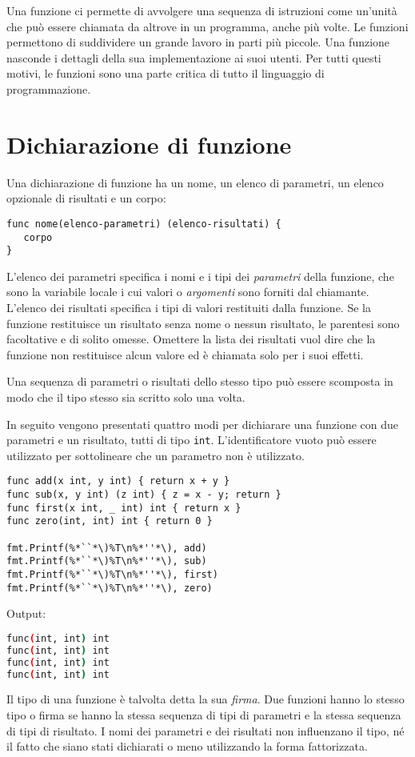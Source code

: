 Una funzione ci permette di avvolgere una sequenza di istruzioni come un'unità che può essere chiamata da altrove in un programma, anche più volte.
Le funzioni permettono di suddividere un grande lavoro in parti più piccole.
Una funzione nasconde i dettagli della sua implementazione ai suoi utenti.
Per tutti questi motivi, le funzioni sono una parte critica di tutto il linguaggio di programmazione.


\section{Dichiarazione di funzione}
\label{sec:dichiarazione_di_funzione}%
Una dichiarazione di funzione ha un nome, un elenco di parametri, un elenco opzionale di risultati e un corpo:
\begin{lstlisting}[label={lst:lstlisting4-1.1}]
func nome(elenco-parametri) (elenco-risultati) {
   corpo
}
\end{lstlisting}
L'elenco dei parametri specifica i nomi e i tipi dei \textit{parametri} della funzione, che sono la variabile locale i cui valori o \textit{argomenti} sono forniti dal chiamante.
L'elenco dei risultati specifica i tipi di valori restituiti dalla funzione.
Se la funzione restituisce un risultato senza nome o nessun risultato, le parentesi sono facoltative e di solito omesse.
Omettere la lista dei risultati vuol dire che la funzione non restituisce alcun valore ed è chiamata solo per i suoi effetti.

Una sequenza di parametri o risultati dello stesso tipo può essere scomposta in modo che il tipo stesso sia scritto solo una volta.

In seguito vengono presentati quattro modi per dichiarare una funzione con due parametri e un risultato, tutti di tipo \verb|int|.
L'identificatore vuoto può essere utilizzato per sottolineare che un parametro non è utilizzato.
\begin{lstlisting}[frame=single, label={lst:lstlisting4-1.2}]
func add(x int, y int) { return x + y }
func sub(x, y int) (z int) { z = x - y; return }
func first(x int, _ int) int { return x }
func zero(int, int) int { return 0 }

fmt.Printf(%*``*\)%T\n%*''*\), add)
fmt.Printf(%*``*\)%T\n%*''*\), sub)
fmt.Printf(%*``*\)%T\n%*''*\), first)
fmt.Printf(%*``*\)%T\n%*''*\), zero)
\end{lstlisting}
Output:
\begin{lstlisting}[language=bash, frame=L, label={lst:lstlisting4-1.3}]
func(int, int) int
func(int, int) int
func(int, int) int
func(int, int) int
\end{lstlisting}
Il tipo di una funzione è talvolta detta la sua \textit{firma}.
Due funzioni hanno lo stesso tipo o firma se hanno la stessa sequenza di tipi di parametri e la stessa sequenza di tipi di risultato.
I nomi dei parametri e dei risultati non influenzano il tipo, né il fatto che siano stati dichiarati o meno utilizzando la forma fattorizzata.

